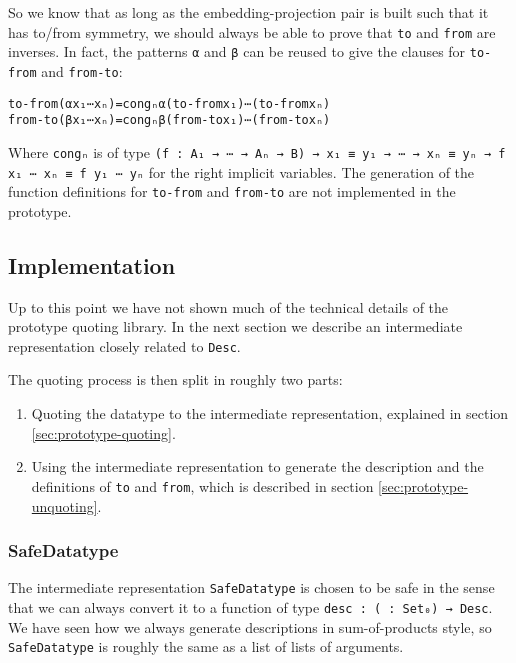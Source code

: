 So we know that as long as the embedding-projection pair is built such
that it has to/from symmetry, we should always be able to prove that
\texttt{to} and \texttt{from} are inverses.
In fact, the patterns \texttt{α} and \texttt{β} can be reused to give
the clauses for \texttt{to-from} and \texttt{from-to}:

\begin{alltt}
to-from  (α x₁⋯xₙ) = congₙ α (to-from  x₁) ⋯ (to-from  xₙ)
from-to  (β x₁⋯xₙ) = congₙ β (from-to  x₁) ⋯ (from-to  xₙ)
\end{alltt}

Where \texttt{congₙ} is of type
\texttt{(f : A₁ → ⋯ → Aₙ → B) → x₁ ≡ y₁ → ⋯ → xₙ ≡ yₙ → f x₁ ⋯ xₙ ≡ f y₁ ⋯ yₙ}
for the right implicit variables.
The generation of the function definitions for \texttt{to-from} and
\texttt{from-to} are not implemented in the prototype.

\subsection{Implementation}\label{sec:prototype-implementation}

Up to this point we have not shown much of the technical
details of the prototype quoting library.
In the next section we describe an intermediate representation closely
related to \texttt{Desc}.

The quoting process is then split in roughly two parts:
\begin{enumerate}
\item Quoting the datatype to the intermediate representation,
  explained in section \ref{sec:prototype-quoting}.
\item Using the intermediate representation to generate the
  description and the definitions of \texttt{to} and \texttt{from},
  which is described in section \ref{sec:prototype-unquoting}.
\end{enumerate}

\subsubsection{SafeDatatype}\label{sec:prototype-safedatatype}

The intermediate representation
\texttt{SafeDatatype} is chosen to
be safe in the sense that we can always convert it to a function of
type \texttt{desc : ( : Set₀) → Desc}.
We have seen how we always generate descriptions in sum-of-products
style, so \texttt{SafeDatatype} is roughly the same as a list of lists
of arguments.


